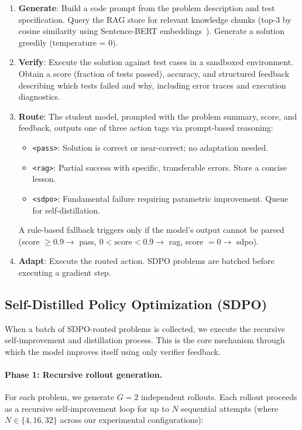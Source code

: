\documentclass[11pt]{article}
\begin{document}
\begin{enumerate}[nosep]
    \item \textbf{Generate}: Build a code prompt from the problem description and test specification. Query the RAG store for relevant knowledge chunks (top-3 by cosine similarity using Sentence-BERT embeddings~\citep{reimers2019sentencebert}). Generate a solution greedily (temperature = 0).
    \item \textbf{Verify}: Execute the solution against test cases in a sandboxed environment. Obtain a score (fraction of tests passed), accuracy, and structured feedback describing which tests failed and why, including error traces and execution diagnostics.
    \item \textbf{Route}: The student model, prompted with the problem summary, score, and feedback, outputs one of three action tags via prompt-based reasoning:
    \begin{itemize}[nosep]
        \item \texttt{<pass>}: Solution is correct or near-correct; no adaptation needed.
        \item \texttt{<rag>}: Partial success with specific, transferable errors. Store a concise lesson.
        \item \texttt{<sdpo>}: Fundamental failure requiring parametric improvement. Queue for self-distillation.
    \end{itemize}
    A rule-based fallback triggers only if the model's output cannot be parsed (score $\geq 0.9 \to$ pass, $0 < \text{score} < 0.9 \to$ rag, score $= 0 \to$ sdpo).
    \item \textbf{Adapt}: Execute the routed action. SDPO problems are batched before executing a gradient step.
\end{enumerate}

\subsection{Self-Distilled Policy Optimization (SDPO)}

When a batch of SDPO-routed problems is collected, we execute the recursive self-improvement and distillation process. This is the core mechanism through which the model improves itself using only verifier feedback.

\paragraph{Phase 1: Recursive rollout generation.} For each problem, we generate $G = 2$ independent rollouts. Each rollout proceeds as a recursive self-improvement loop for up to $N$ sequential attempts (where $N \in \{4, 16, 32\}$ across our experimental configurations):
\end{document}
